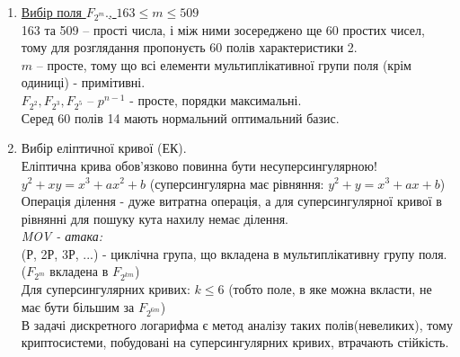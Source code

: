 \begin{enumerate}
        \item \underline{Вибір поля $F_{2^{m}}.$, $163\leq m \leq 509$}\\
        163 та 509 -- прості числа, і між ними зосереджено ще 60 простих чисел, тому для розглядання пропонуєть 60 полів характеристики 2.\\
        $m$ -- просте, тому що всі елементи мультиплікативної групи поля (крім одиниці) - примітивні.\\
        
        $F_{2^{2}}, F_{2^{3}}, F_{2^{5}}$ -- $p^{n-1}$ - просте, порядки максимальні.\\
                
        Серед 60 полів 14 мають нормальний оптимальний базис.\\
        \item Вибір еліптичної кривої (ЕК).\\
        Еліптична крива обов'язково повинна бути несуперсингулярною!\\
        $y^{2}+xy=x^{3}+ax^{2}+b$ (суперсингулярна має рівняння: $y^{2}+y=x^{3}+ax+b$)\\
        
        Операція ділення - дуже витратна
        операція, а для суперсингулярної кривої в рівнянні для пошуку кута нахилу немає ділення.\\
        \emph{MOV - атака:}\\
        (Р, 2Р, 3Р, ...) - циклічна група, що вкладена в мультиплікативну групу поля. ($F_{2^{m}}$ вкладена в $F_{2^{km}}$)\\
        Для суперсингулярних кривих: $k \leq $6 (тобто поле, в яке можна вкласти, не має бути більшим за $F_{2^{6m}}$)\\
        В задачі дискретного логарифма є метод аналізу таких полів(невеликих), тому криптосистеми, побудовані на суперсингулярних кривих, втрачають стійкість.\\
        

\end{enumerate}
